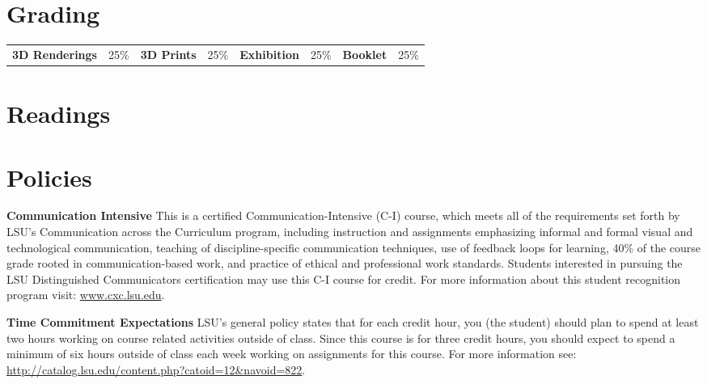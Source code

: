 \documentclass[11pt,article,oneside]{memoir}
\begin{document}
\section{Grading}

\begin{table}[H]
\small
\begin{tabular}{l l l l l l l l}
\textbf{3D Renderings} & 25\% &
\textbf{3D Prints} & 25\% &
\textbf{Exhibition} & 25\% &
\textbf{Booklet} & 25\% \\
\end{tabular}
\end{table}

\section{Readings}
\renewcommand*{\bibfont}{\normalsize} %
\vspace*{0.5cm}
\nocite{*}
\setlength{}
\printbibliography[heading=none]


\section{Policies}

\noindent \textbf{Communication Intensive}
This is a certified Communication-Intensive (C-I) course,
which meets all of the requirements set
forth by LSU’s Communication across the Curriculum program, including
 instruction and assignments emphasizing
informal and formal visual and technological communication,
teaching of discipline-specific communication techniques,
use of feedback loops for learning,
40\% of the course grade rooted in communication-based work, and
practice of ethical and professional work standards.
Students interested in pursuing the LSU Distinguished Communicators 
certification may use this C-I course for credit. 
For more information about this student recognition program visit: 
\url{www.cxc.lsu.edu}.\\

\clearpage

\noindent \textbf{Time Commitment Expectations}
LSU's general policy states that for each credit hour, you (the student) should plan to
spend at least two hours working on course related activities outside of class. Since this course is for three credit hours, you should expect to spend a minimum of six hours outside of class each week working on assignments for this course. For more information see: 
\url{http://catalog.lsu.edu/content.php?catoid=12&navoid=822}.\\
\end{document}

